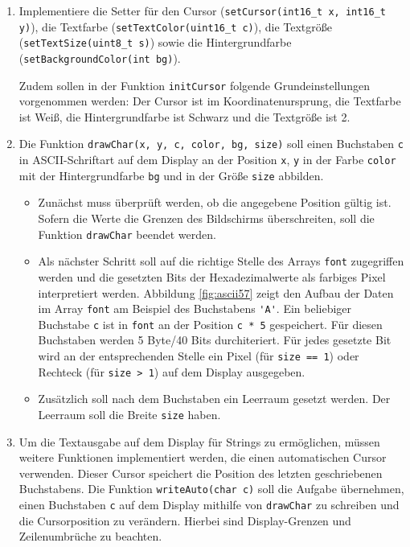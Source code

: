 \begin{enumerate}
\item 
Implementiere die Setter für den Cursor (\lstinline|setCursor(int16_t x, int16_t y)|), die Textfarbe (\lstinline|setTextColor(uint16_t c)|), die Textgröße (\lstinline|setTextSize(uint8_t s)|) sowie die Hintergrundfarbe (\lstinline|setBackgroundColor(int bg)|).

Zudem sollen in der Funktion \lstinline|initCursor| folgende Grundeinstellungen vorgenommen werden: 
Der Cursor ist im Koordinatenursprung, die Textfarbe ist Weiß, die Hintergrundfarbe ist Schwarz und die Textgröße ist 2.

\item
Die Funktion \lstinline|drawChar(x, y, c, color, bg, size)| soll einen Buchstaben \lstinline|c| in ASCII-Schriftart auf dem Display an der Position \lstinline|x|, \lstinline|y| in der Farbe \lstinline|color| mit der Hintergrundfarbe \lstinline|bg| und in der Größe \lstinline|size| abbilden.
\begin{itemize}
\item 
Zunächst muss überprüft werden, ob die angegebene Position gültig ist.
Sofern die Werte die Grenzen des Bildschirms überschreiten, soll die Funktion \lstinline|drawChar| beendet werden.

\item 
Als nächster Schritt soll auf die richtige Stelle des Arrays \lstinline|font| zugegriffen werden und die gesetzten Bits der Hexadezimalwerte als farbiges Pixel interpretiert werden.
Abbildung \ref{fig:ascii57} zeigt den Aufbau der Daten im Array \lstinline|font| am Beispiel des Buchstabens \lstinline|'A'|.
Ein beliebiger Buchstabe \lstinline|c| ist in \lstinline|font| an der Position \lstinline|c * 5| gespeichert.
Für diesen Buchstaben werden 5 Byte/40 Bits durchiteriert.
Für jedes gesetzte Bit wird an der entsprechenden Stelle ein Pixel (für \lstinline|size == 1|) oder Rechteck (für \lstinline|size > 1|) auf dem Display ausgegeben.
\item 
Zusätzlich soll nach dem Buchstaben ein Leerraum gesetzt werden.
Der Leerraum soll die Breite \lstinline|size| haben.
\end{itemize}

\item 
Um die Textausgabe auf dem Display für Strings zu ermöglichen, müssen weitere Funktionen implementiert werden, die einen automatischen Cursor verwenden.
Dieser Cursor speichert die Position des letzten geschriebenen Buchstabens.
Die Funktion \lstinline|writeAuto(char c)| soll die Aufgabe übernehmen, einen Buchstaben \lstinline|c| auf dem Display mithilfe von \lstinline|drawChar| zu schreiben und die Cursorposition zu verändern.
Hierbei sind Display-Grenzen und Zeilenumbrüche zu beachten.


\end{enumerate}
